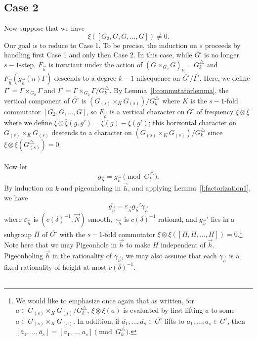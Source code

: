 \documentclass[11pt, a4paper]{amsart}
\theoremstyle{plain}
\theoremstyle{plain}
\theoremstyle{definition}
\theoremstyle{remark}
\numberwithin{equation}{section}
\numberwithin{lemma}{section}
\numberwithin{proposition}{section}
\numberwithin{corollary}{section}
\numberwithin{definition}{section}
\numberwithin{claim}{section}
\begin{document}
\subsection{Case 2}
Now suppose that we have
$$\xi([G_2, G, G, \dots, G]) \neq 0.$$
Our goal is to reduce to Case 1. To be precise, the induction on $s$ proceeds by handling first Case 1 and only then Case 2. In this case, while $\overline{G^\square}$ is no longer $s - 1$-step, $F_{\vec{h}}$ is invariant under the action of $(G \times_{G_2} G)_k = G_k^\triangle$ and $F_{\vec{h}}(g_{\vec{h}}(n)\Gamma)$ descends to a degree $k - 1$ nilsequence on $\overline{G^\square}/\overline{\Gamma^\square}$. Here, we define $\Gamma^\square = \Gamma \times_{G_2} \Gamma$ and $\overline{\Gamma^\square} = \Gamma \times_{G_2} \Gamma/G_k^\triangle$. By Lemma~\ref{l:commutatorlemma}, the vertical component of $\overline{G^\square}$ is $(G_{(s)} \times_{K} G_{(s)})/G_k^\triangle$
where $K$ is the $s - 1$-fold commutator $[G_2, G, \dots, G]$, so $F_{\vec{h}}$ is a vertical character on $G^\square$ of frequency $\xi \otimes \overline{\xi}$ where we define $\xi \otimes \overline{\xi}(g, g') = \xi(g) - \xi(g')$; this horizontal character on $G_{(s)} \times_K G_{(s)}$ descends to a character on $(G_{(s)} \times_K G_{(s)})/G_k^\triangle$ since $\xi \otimes \overline{\xi}(G^\triangle_{(s)}) = 0$. \\\\
Now let 
$$\overline{g_{\vec{h}}} = g_{\vec{h}} \pmod{G_k^\triangle}.$$
By induction on $k$ and pigeonholing in $\vec{h}$, and applying Lemma~\ref{l:factorization1}, we have
$$\overline{g_{\vec{h}}} = \varepsilon_{\vec{h}} g_{\vec{h}}' \gamma_{\vec{h}}$$
where $\varepsilon_{\vec{h}}$ is $(c(\delta)^{-1}, \vec{N})$-smooth, $\gamma_{\vec{h}}$ is $c(\delta)^{-1}$-rational, and $g_{\vec{h}}'$ lies in a subgroup $H$ of $\overline{G^\square}$ with the $s - 1$-fold commutator $\xi \otimes \overline{\xi}([H, H, \dots, H]) = 0$.\footnote{We would like to emphasize once again that as written, for $\overline{a} \in G_{(s)} \times_K G_{(s)}/G_k^\triangle$, $\xi \otimes \overline{\xi}(\overline{a})$ is evaluated by first lifting $\overline{a}$ to some $a \in G_{(s)} \times_K G_{(s)}$. In addition, if $\overline{a_1}, \dots, \overline{a_s} \in \overline{G^\square}$ lifts to $a_1, \dots, a_s \in G^\square$, then $[\overline{a}_1, \dots, \overline{a}_s] = [a_1, \dots, a_s] \pmod{G_k^\triangle}$.} Note here that we may Pigeonhole in $\vec{h}$ to make $H$ independent of $\vec{h}$. Pigeonholing $\vec{h}$ in the rationality of $\gamma_{\vec{h}}$, we may also assume that each $\gamma_{\vec{h}}$ is a fixed rationality of height at most $c(\delta)^{-1}$. \\\\
\end{document}
